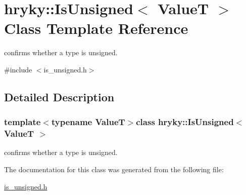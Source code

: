 \hypertarget{classhryky_1_1_is_unsigned}{\section{hryky\-:\-:Is\-Unsigned$<$ Value\-T $>$ Class Template Reference}
\label{classhryky_1_1_is_unsigned}
}


confirms whether a type is unsigned.  




{\ttfamily \#include $<$is\-\_\-unsigned.\-h$>$}



\subsection{Detailed Description}
\subsubsection*{template$<$typename Value\-T$>$class hryky\-::\-Is\-Unsigned$<$ Value\-T $>$}

confirms whether a type is unsigned. 

The documentation for this class was generated from the following file\-:\begin{DoxyCompactItemize}
\item 
\hyperlink{is__unsigned_8h}{is\-\_\-unsigned.\-h}\end{DoxyCompactItemize}
